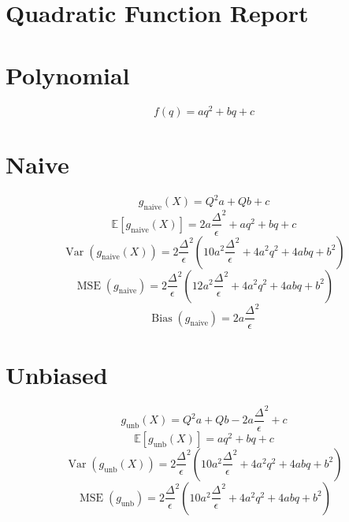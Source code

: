 \documentclass{article}
\begin{document}
\section*{Quadratic Function Report}
\section*{Polynomial}
\begin{dmath*}
f(q) = a q^{2} + b q + c
\end{dmath*}
\section*{Naive}
\begin{dmath*}
g_{\mathrm{naive}}(X) = Q^{2} a + Q b + c
\end{dmath*}
\begin{dmath*}
\mathbb{E}[g_{\mathrm{naive}}(X)] = 2 a {\frac{\Delta}{\epsilon}}^{2} + a q^{2} + b q + c
\end{dmath*}
\begin{dmath*}
\operatorname{Var}(g_{\mathrm{naive}}(X)) = 2 {\frac{\Delta}{\epsilon}}^{2} \left(10 a^{2} {\frac{\Delta}{\epsilon}}^{2} + 4 a^{2} q^{2} + 4 a b q + b^{2}\right)
\end{dmath*}
\begin{dmath*}
\operatorname{MSE}(g_{\mathrm{naive}}) = 2 {\frac{\Delta}{\epsilon}}^{2} \left(12 a^{2} {\frac{\Delta}{\epsilon}}^{2} + 4 a^{2} q^{2} + 4 a b q + b^{2}\right)
\end{dmath*}
\begin{dmath*}
\operatorname{Bias}(g_{\mathrm{naive}}) = 2 a {\frac{\Delta}{\epsilon}}^{2}
\end{dmath*}
\section*{Unbiased}
\begin{dmath*}
g_{\mathrm{unb}}(X) = Q^{2} a + Q b - 2 a {\frac{\Delta}{\epsilon}}^{2} + c
\end{dmath*}
\begin{dmath*}
\mathbb{E}[g_{\mathrm{unb}}(X)] = a q^{2} + b q + c
\end{dmath*}
\begin{dmath*}
\operatorname{Var}(g_{\mathrm{unb}}(X)) = 2 {\frac{\Delta}{\epsilon}}^{2} \left(10 a^{2} {\frac{\Delta}{\epsilon}}^{2} + 4 a^{2} q^{2} + 4 a b q + b^{2}\right)
\end{dmath*}
\begin{dmath*}
\operatorname{MSE}(g_{\mathrm{unb}}) = 2 {\frac{\Delta}{\epsilon}}^{2} \left(10 a^{2} {\frac{\Delta}{\epsilon}}^{2} + 4 a^{2} q^{2} + 4 a b q + b^{2}\right)
\end{dmath*}
\end{document}
